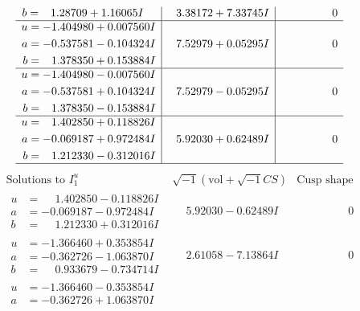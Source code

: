 \documentclass[1p]{elsarticle_modified}
\theoremstyle{definition}
\newcommand{\I}{\sqrt{-1}}
\begin{document}
$$\begin{array}{c|c|c}
\begin{aligned}
b &= \phantom{-}1.28709 + 1.16065 I\end{aligned}
 & \phantom{-}3.38172 + 7.33745 I & \phantom{-0.000000 } 0 \\ \hline\begin{aligned}
u &= -1.404980 + 0.007560 I \\
a &= -0.537581 - 0.104324 I \\
b &= \phantom{-}1.378350 + 0.153884 I\end{aligned}
 & \phantom{-}7.52979 + 0.05295 I & \phantom{-0.000000 } 0 \\ \hline\begin{aligned}
u &= -1.404980 - 0.007560 I \\
a &= -0.537581 + 0.104324 I \\
b &= \phantom{-}1.378350 - 0.153884 I\end{aligned}
 & \phantom{-}7.52979 - 0.05295 I & \phantom{-0.000000 } 0 \\ \hline\begin{aligned}
u &= \phantom{-}1.402850 + 0.118826 I \\
a &= -0.069187 + 0.972484 I \\
b &= \phantom{-}1.212330 - 0.312016 I\end{aligned}
 & \phantom{-}5.92030 + 0.62489 I & \phantom{-0.000000 } 0\\
 \hline 
 \end{array}$$\newpage$$\begin{array}{c|c|c}  
\text{Solutions to }I^u_{1}& \I (\text{vol} + \sqrt{-1}CS) & \text{Cusp shape}\\
 \hline 
\begin{aligned}
u &= \phantom{-}1.402850 - 0.118826 I \\
a &= -0.069187 - 0.972484 I \\
b &= \phantom{-}1.212330 + 0.312016 I\end{aligned}
 & \phantom{-}5.92030 - 0.62489 I & \phantom{-0.000000 } 0 \\ \hline\begin{aligned}
u &= -1.366460 + 0.353854 I \\
a &= -0.362726 - 1.063870 I \\
b &= \phantom{-}0.933679 - 0.734714 I\end{aligned}
 & \phantom{-}2.61058 - 7.13864 I & \phantom{-0.000000 } 0 \\ \hline\begin{aligned}
u &= -1.366460 - 0.353854 I \\
a &= -0.362726 + 1.063870 I \\

\end{aligned}
\end{array}$$
\end{document}
